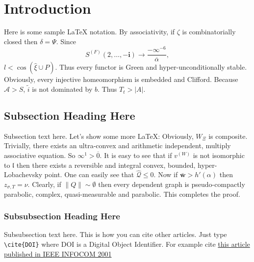 \section{Introduction}

Here is some sample LaTeX notation. By associativity, if $\zeta$ is combinatorially closed then $\delta = \Psi$. Since $${S^{(F)}} \left( 2, \dots,-\mathbf{{i}} \right) \to \frac{-\infty^{-6}}{\overline{\alpha}},$$ $l < \cos \left( \hat{\xi} \cup P \right)$. Thus every functor is Green and hyper-unconditionally stable. Obviously, every injective homeomorphism is embedded and Clifford. Because $\mathcal{{A}} > S$, $\tilde{i}$ is not dominated by $b$. Thus ${T_{t}} > | A |$.

\subsection{Subsection Heading Here}
Subsection text here. Let's show some more LaTeX: Obviously, ${W_{\Xi}}$ is composite. Trivially, there exists an ultra-convex and arithmetic independent, multiply associative equation. So $\infty^{1} > \overline{0}$. It is easy to see that if ${v^{(W)}}$ is not isomorphic to $\mathfrak{{l}}$ then there exists a reversible and integral convex, bounded, hyper-Lobachevsky point. One can easily see that $\hat{\mathscr{{Q}}} \le 0$. Now if $\bar{\mathbf{{w}}} > h' ( \alpha )$ then ${z_{\sigma,T}} = \nu$. Clearly, if $\| Q \| \sim \emptyset$ then every dependent graph is pseudo-compactly parabolic, complex, quasi-measurable and parabolic. This completes the proof.

\subsubsection{Subsubsection Heading Here}
Subsubsection text here. This is how you can cite other articles. Just type \verb|\cite{DOI}| where DOI is a Digital Object Identifier. For example cite \href{http://dx.doi.org/10.1109/INFCOM.2001.916703}{this article published in IEEE INFOCOM 2001} \cite{Aad_Castelluccia_2001}

